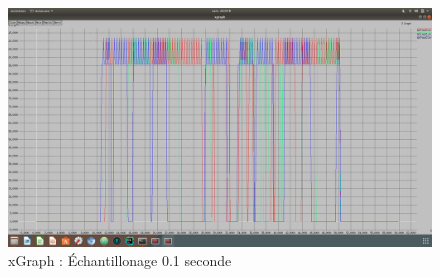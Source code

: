 \documentclass{article}
\begin{document}
    \begin{figure}
      \centering
        \includegraphics[width=0.99\columnwidth]{0,1.png}
        \caption{xGraph : Échantillonage 0.1 seconde}
    \end{figure}
\end{document}
